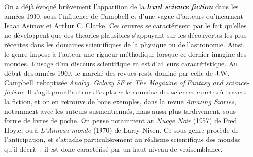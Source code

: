 \documentclass[letterpaper,portrait,12pt]{article}
\begin{document}
	On a d\'{e}j\`{a} \'{e}voqu\'{e} bri\`{e}vement l'apparition de la \textbf{\emph{hard science}}\emph{ }\textbf{\emph{fiction}}\textbf{ }dans les ann\'{e}es 1930, sous l'influence de Campbell et d'une vague d'auteurs qu'incarnent Isaac Asimov et Arthur C. Clarke. Ces \oe{}uvres se caract\'{e}risent par le fait qu'elles ne d\'{e}veloppent que des th\'{e}ories plausibles s'appuyant sur les d\'{e}couvertes les plus r\'{e}centes dans les domaines scientifiques de la physique ou de l'astronomie. Ainsi, le genre impose \`{a} l'auteur une rigueur m\'{e}thodique lorsque ce dernier imagine des mondes. L'usage d'un discours scientifique en est d'ailleurs caract\'{e}ristique. Au d\'{e}but des ann\'{e}es 1960, le march\'{e} des revues reste domin\'{e} par celle de J.W. Campbell, rebaptis\'{e}e \emph{Analog}. \emph{Galaxy SF} et \emph{The Magazine of Fantasy and science-fiction}. Il s'agit pour l'auteur d'explorer le domaine des sciences exactes \`{a} travers la fiction, et on en retrouve de bons exemples, dans la revue\emph{ Amazing Stories}, notamment avec les auteurs susmentionn\'{e}s, mais aussi plus tardivement, sous forme de livres de poche. On pense notamment au \emph{Nuage Noir} (1957) de Fred Hoyle, ou \`{a} \emph{L'Anneau-monde} (1970) de Larry Niven. Ce sous-genre proc\`{e}de de l'anticipation, et s'attache particuli\`{e}rement au r\'{e}alisme scientifique des mondes qu'il d\'{e}crit : il  est donc caract\'{e}ris\'{e} par un haut niveau de vraisemblance.
\end{document}
